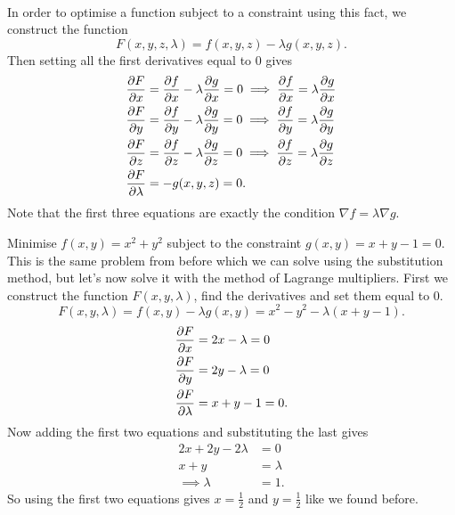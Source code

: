 \documentclass[../multivariate_calculus.tex]{subfiles}
\begin{document}
        \paragraph{}
        In order to optimise a function subject to a constraint using this fact, we construct the function
        \begin{equation}
            F(x,y,z,\lambda)=f(x,y,z)-\lambda g(x,y,z).
        \end{equation} 
        Then setting all the first derivatives equal to 0 gives
        \begin{align}
            \pdv{F}{x}&=\pdv{f}{x}-\lambda\pdv{g}{x}=0\implies\pdv{f}{x}=\lambda\pdv{g}{x}\\
            \pdv{F}{y}&=\pdv{f}{y}-\lambda\pdv{g}{y}=0\implies\pdv{f}{y}=\lambda\pdv{g}{y}\\
            \pdv{F}{z}&=\pdv{f}{z}-\lambda\pdv{g}{z}=0\implies\pdv{f}{z}=\lambda\pdv{g}{z}\\
            \pdv{F}{\lambda}&=-g(x,y,z)=0.
        \end{align}
        Note that the first three equations are exactly the condition $\nabla f=\lambda\nabla g$.
        \begin{example}
            Minimise $f(x,y)=x^2+y^2$ subject to the constraint $g(x,y)=x+y-1=0$.
            This is the same problem from before which we can solve using the substitution method, but let's now solve it with the method of Lagrange multipliers.
            First we construct the function $F(x,y,\lambda)$, find the derivatives and set them equal to 0.
            \begin{equation}
                F(x,y,\lambda)=f(x,y)-\lambda g(x,y)=x^2-y^2-\lambda(x+y-1).
            \end{equation}
            \begin{align}
                \pdv{F}{x}&=2x-\lambda=0\\
                \pdv{F}{y}&=2y-\lambda=0\\
                \pdv{F}{\lambda}&=x+y-1=0.
            \end{align}
            Now adding the first two equations and substituting the last gives
            \begin{align}
                2x+2y-2\lambda&=0\\
                x+y&=\lambda\\
                \implies\lambda&=1.
            \end{align}
            So using the first two equations gives $x=\frac{1}{2}$ and $y=\frac{1}{2}$ like we found before.
        \end{example}
\end{document}
